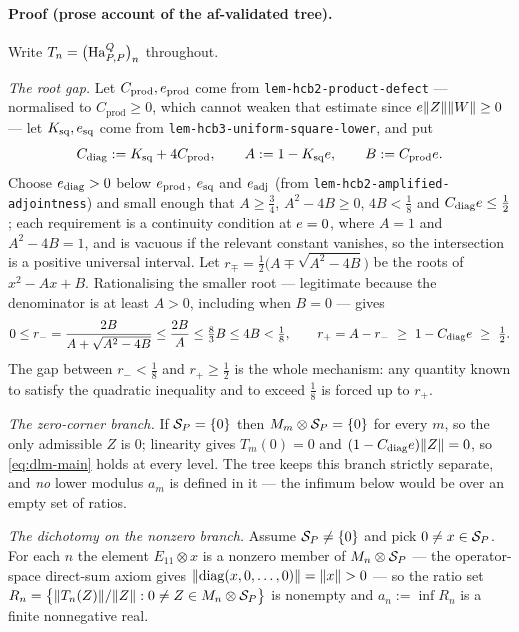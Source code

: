 \paragraph{Proof (prose account of the af-validated tree).}
Write $T_n=\bigl(\mathrm{Ha}^{Q}_{P,P}\bigr)_{n}$ throughout.

\emph{The root gap.} Let $C_{\mathrm{prod}},e_{\mathrm{prod}}$ come from
\texttt{lem-hcb2-product-defect} --- normalised to $C_{\mathrm{prod}}\ge0$, which cannot
weaken that estimate since $e\lVert Z\rVert\lVert W\rVert\ge0$ --- let
$K_{\mathrm{sq}},e_{\mathrm{sq}}$ come from
\texttt{lem-hcb3-uniform-square-lower}, and put
\[
  C_{\mathrm{diag}}:=K_{\mathrm{sq}}+4C_{\mathrm{prod}},
  \qquad A:=1-K_{\mathrm{sq}}e,\qquad B:=C_{\mathrm{prod}}e .
\]
Choose $e_{\mathrm{diag}}>0$ below $e_{\mathrm{prod}}$, $e_{\mathrm{sq}}$ and
$e_{\mathrm{adj}}$ (from \texttt{lem-hcb2-amplified-adjointness}) and small enough
that $A\ge\tfrac34$, $A^{2}-4B\ge0$, $4B<\tfrac18$ and $C_{\mathrm{diag}}e\le\tfrac12$;
each requirement is a continuity condition at $e=0$, where $A=1$ and $A^{2}-4B=1$, and
is vacuous if the relevant constant vanishes, so the intersection is a positive universal
interval. Let $r_\mp=\tfrac12\bigl(A\mp\sqrt{A^{2}-4B}\bigr)$ be the roots of
$x^{2}-Ax+B$. Rationalising the smaller root --- legitimate because the denominator is at
least $A>0$, including when $B=0$ --- gives
\begin{equation}\label{eq:dlm-roots}
  0\le r_-=\frac{2B}{A+\sqrt{A^{2}-4B}}\le\frac{2B}{A}\le\tfrac83B\le4B<\tfrac18,
  \qquad
  r_+=A-r_-\ \ge\ 1-C_{\mathrm{diag}}e\ \ge\ \tfrac12 .
\end{equation}
The gap between $r_-<\tfrac18$ and $r_+\ge\tfrac12$ is the whole mechanism: any quantity
known to satisfy the quadratic inequality and to exceed $\tfrac18$ is forced up to $r_+$.

\emph{The zero-corner branch.} If $\mathcal S_{P}=\{0\}$ then $M_{m}\otimes \mathcal S_{P}=\{0\}$ for
every $m$, so the only admissible $Z$ is $0$; linearity gives $T_m(0)=0$ and
$(1-C_{\mathrm{diag}}e)\lVert Z\rVert=0$, so \eqref{eq:dlm-main} holds at every level. The
tree keeps this branch strictly separate, and \emph{no} lower modulus $a_m$ is defined in
it --- the infimum below would be over an empty set of ratios.

\emph{The dichotomy on the nonzero branch.} Assume $\mathcal S_{P}\ne\{0\}$ and pick
$0\ne x\in\mathcal S_{P}$. For each $n$ the element $E_{11}\otimes x$ is a nonzero member of
$M_{n}\otimes \mathcal S_{P}$ --- the operator-space direct-sum axiom gives
$\lVert \operatorname{diag}(x,0,\dots,0)\rVert=\lVert x\rVert>0$ --- so the ratio set
$R_n=\bigl\{\lVert T_n(Z)\rVert/\lVert Z\rVert:0\ne Z\in M_{n}\otimes \mathcal S_{P}\bigr\}$ is nonempty and
$a_n:=\inf R_n$ is a finite nonnegative real.

